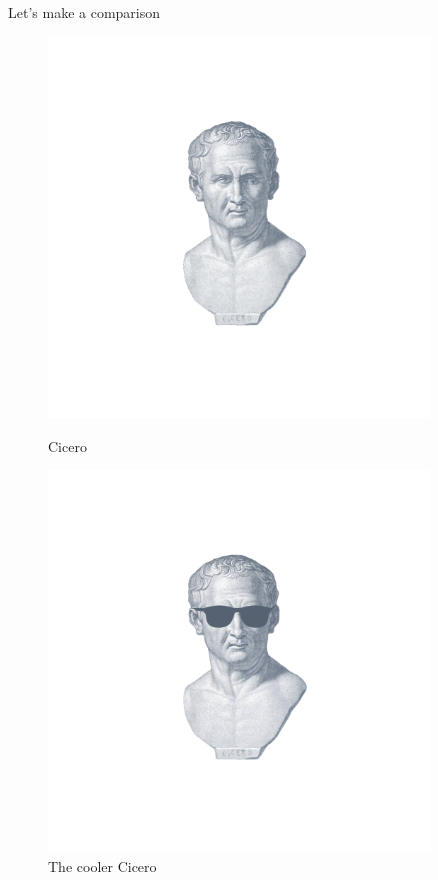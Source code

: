 \documentclass[12pt]{article}
\begin{document}
\newpage

Let's make a comparison

%

\begin{figure}[ht!]
    \begin{minipage}{0.45\textwidth}
        \centering
        \includegraphics[width=0.9\textwidth]{images/cicero.png} %
        \caption{Cicero}
    \end{minipage}\hfill
    \begin{minipage}{0.45\textwidth}
        \centering
        \includegraphics[width=0.9\textwidth]{images/cicero_glasses.png} %
        \caption{The cooler Cicero}
    \end{minipage}
\end{figure}
\end{document}
